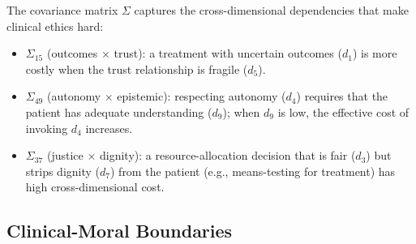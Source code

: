 \documentclass[12pt]{article}
\theoremstyle{definition}
\theoremstyle{remark}
\begin{document}
The covariance matrix $\Sigma$ captures the cross-dimensional dependencies that make clinical ethics hard:
\begin{itemize}
    \item $\Sigma_{15}$ (outcomes $\times$ trust): a treatment with uncertain outcomes ($d_1$) is more costly when the trust relationship is fragile ($d_5$).
    \item $\Sigma_{49}$ (autonomy $\times$ epistemic): respecting autonomy ($d_4$) requires that the patient has adequate understanding ($d_9$); when $d_9$ is low, the effective cost of invoking $d_4$ increases.
    \item $\Sigma_{37}$ (justice $\times$ dignity): a resource-allocation decision that is fair ($d_3$) but strips dignity ($d_7$) from the patient (e.g., means-testing for treatment) has high cross-dimensional cost.
\end{itemize}

\subsection{Clinical-Moral Boundaries}
\end{document}
